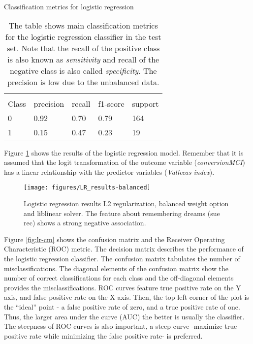 \documentclass[11pt]{article}
\theoremstyle{definition}
\theoremstyle{remark}
\begin{document}
\begin{table}[H]
\caption{Classification metrics for logistic regression} \label{tab:logreg} 
\begin{center} 
\begin{tabular}{lllll}
\hline
\multicolumn{1}{c}{} \\
Class & precision & recall & f1-score & support     \\
\hline
0 & 0.92  &    0.70   &   0.79   &    164 \\
1 & 0.15  &    0.47   &   0.23   &     19 \\
\hline
\end{tabular}
\caption{The table shows  main classification metrics for the logistic regression classifier in the test set. Note that the recall of the positive class is also known as \emph{sensitivity} and recall of the negative class is also called \emph{specificity}. The precision is low due to the unbalanced data.}
\end{center}
\end{table}


Figure \ref{fig:logresres} shows the results of the logistic regression model. Remember that it is assumed that the logit transformation of the outcome variable (\emph{conversionMCI}) has a linear relationship with the predictor variables (\emph{Vallecas index}).

\begin{figure}[H]
        \centering
        \texttt{[image: figures/LR\_results-balanced]}
        \caption{Logistic regression results L2 regularization, balanced weight option and liblinear solver. The feature about remembering dreams (sue rec) shows a strong negative association.} \label{fig:logresres}
\end{figure}


Figure \ref{fig:lr-cm} shows the confusion matrix and the Receiver Operating Characteristic (ROC) metric. The decision matrix describes the performance of the logistic regression classifier. The confusion matrix tabulates the number of misclassifications. The diagonal elements of the confusion matrix show the number of correct classifications for each class and the off-diagonal elements provides the misclassifications. 
ROC curves feature true positive rate on the Y axis, and false positive rate on the X axis. Then, the top left corner of the plot is the “ideal” point - a false positive rate of zero, and a true positive rate of one. 
Thus, the larger area under the curve (AUC) the better is usually the classifier.
The steepness of ROC curves is also important, a steep curve -maximize true positive rate while minimizing the false positive rate- is preferred.
\end{document}

